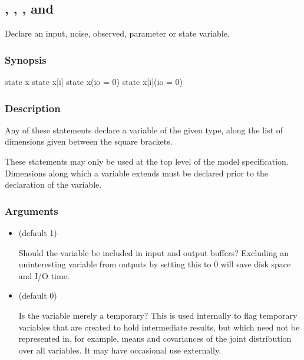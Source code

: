 \subsection{, , ,  and \label{var}}

Declare an input, noise, observed, parameter or state variable.

\subsubsection*{Synopsis\label{var_Synopsis}}

\begin{bicode}
    state x
    state x[i]
    state x(io = 0)
    state x[i](io = 0)
\end{bicode}

\subsubsection*{Description\label{var_Description}}

Any of these statements declare a variable of the given type, along the list
of dimensions given between the square brackets.

These statements may only be used at the top level of the model
specification. Dimensions along which a variable extends must be declared
prior to the declaration of the variable.

\subsubsection*{Arguments\label{var_Arguments}}

\begin{itemize}
\item {} (default 1)

Should the variable be included in input and output buffers? Excluding an
uninteresting variable from outputs by setting this to 0 will save disk space
and I/O time.

\item {} (default 0)

Is the variable merely a temporary? This is used internally to flag
temporary variables that are created to hold intermediate results, but which
need not be represented in, for example, means and covariances of the joint
distribution over all variables. It may have occasional use externally.

\end{itemize}

